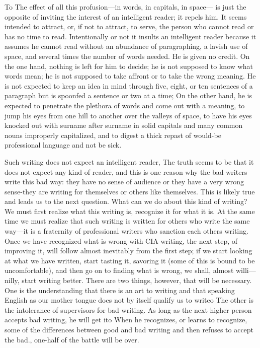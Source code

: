 \documentclass[
    oneside,
    11pt,
]{memoir}
\begin{document}
To The effect of all this profusion---in words, in capitals, in space--- is just the opposite of inviting the interest of an intelligent reader; it repels him. It seems intended to attract, or, if not to attract, to serve, the person who cannot read or has no time to read. Intentionally or not it insults an intelligent reader because it assumes he cannot read without an abundance of paragraphing, a lavish use of space, and several times the number of words needed. He is given no credit. On the one hand, nothing is left for him to decide; he is not supposed to know what words mean; he is not supposed to take affront or to take the wrong meaning. He is not expected to keep an idea in mind through five, eight, or ten sentences of a paragraph but is spoonfed a sentence or two at a time; On the other hand, he is expected to penetrate the plethora of words and come out with a meaning, to jump his eyes from one hill to another over the valleys of space, to have his eyes knocked out with surname after surname in solid capitals and many common nouns improperly capitalized, and to digest a thick repast of would-be professional language and not be sick.

Such writing does not expect an intelligent reader, The truth seems to be that it does not expect any kind of reader, and this is one reason why the bad writers write this bad way: they have no sense of audience or they have a very wrong sense-they are writing for themselves or others like themselves. This is likely true and leads us to the next question. What can we do about this kind of writing? We must first realize what this writing is, recognize it for what it is. At the same time we must realize that such writing is written for others who write the same way---it is a fraternity of professional writers who sanction each others writing. Once we have recognized what is wrong with CIA writing, the next step, of improving it, will follow almost inevitably from the first step; if we start looking at what we have written, start tasting it, savoring it (some of this is bound to be uncomfortable), and then go on to finding what is wrong, we shall, almost willi---nilly, start writing better. There are two things, however, that will be necessary. One is the understanding that there is an art to writing and that speaking English as our mother tongue does not by itself qualify us to writeo The other is the intolerance of supervisors for bad writing. As long as the next higher person accepts bad writing, he will get ito When he recognizes, or learns to recognize, some of the differences between good and bad writing and then refuses to accept the bad., one-half of the battle will be over.
\end{document}
